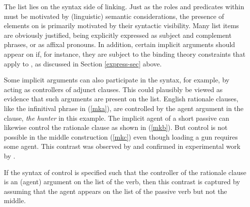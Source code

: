 \documentclass[output=paper
                ,modfonts
                ,nonflat
	        ,collection
	        ,collectionchapter
	        ,collectiontoclongg
 	        ,biblatex
                ,babelshorthands
                ,newtxmath
                ,draftmode
                ,colorlinks, citecolor=brown
]{./langsci/langscibook}
\begin{document}
The \argst list lies on the syntax side of linking.  Just as the roles and predicates within \content must be motivated by (linguistic) semantic considerations, the presence of elements on \argst is primarily motivated by their syntactic visibility.  Many \argst list items are obviously justified, being explicitly expressed as subject and complement phrases, or as affixal pronouns.  In addition, certain implicit arguments should appear on \argst if, for instance, they are subject to the binding theory constraints that apply to \argst, as discussed in Section \ref{express-sec} above.

Some implicit arguments can also participate in the syntax, for example, by acting as controllers of adjunct clauses.  This could plausibly be viewed as evidence that such arguments are present on the \argst list.
English rationale clauses, like the infinitival phrase in (\ref{mka}), are controlled  by the agent argument in the clause, \textit{the hunter} in this example.
The implicit agent of a short passive  can likewise control the rationale clause as shown in (\ref{mkb}).
But control is not possible in the middle construction (\ref{mkc}) even though loading a gun requires some agent.
This contrast was observed by \citet{KeyserandRoeper1984} and confirmed in experimental work by \citet{MaunerandKoenig2000}.  

\begin{exe}
\ex\label{mk}
\begin{xlist}
\end{xlist}
\end{exe}



\noindent
If the syntax of control  is specified such that the controller of the rationale clause is an (agent) argument on the \argst list of the verb, then this contrast is captured by assuming that the agent appears on the \argst list of the passive verb but not the middle.
\end{document}
